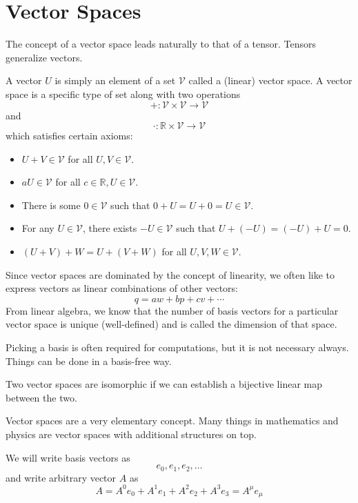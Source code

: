 


\tableofcontents



\chapter{Vector Spaces}
The concept of a vector space leads naturally to that of a tensor. Tensors generalize vectors.

A vector $U$ is simply an element of a set $\mathcal{V}$ called a (linear) vector space. A vector space is a specific type of set along with two operations \[ +: \mathcal{V}\times \mathcal{V} \rightarrow \mathcal{V} \] and \[ \cdot : \mathbb{R} \times \mathcal{V} \rightarrow \mathcal{V} \] which satisfies certain axioms:
\begin{itemize}
	\setlength\itemsep{0em}
	\item $U+V \in \mathcal{V}$ for all $U,V \in \mathcal{V}$.
	\item $aU \in \mathcal{V}$ for all $c\in \mathbb{R}, U \in \mathcal{V}$.
	\item There is some $0 \in \mathcal{V}$ such that $0+U=U+0=U \in \mathcal{V}$.
	\item For any $U \in \mathcal{V}$, there exists $-U \in \mathcal{V}$ such that $U+(-U) = (-U)+U = 0$.
	\item $\left(U+V\right)+W = U + \left(V+W\right)$ for all $U,V,W \in \mathcal{V}$.
\end{itemize}

Since vector spaces are dominated by the concept of linearity, we often like to express vectors as linear combinations of other vectors: \[ q = aw + bp + cv + \cdots \] From linear algebra, we know that the number of basis vectors for a particular vector space is unique (well-defined) and is called the dimension of that space.

Picking a basis is often required for computations, but it is not necessary always. Things can be done in a basis-free way.

Two vector spaces are isomorphic if we can establish a bijective linear map between the two.

Vector spaces are a very elementary concept. Many things in mathematics and physics are vector spaces with additional structures on top.

We will write basis vectors as \[ e_0, e_1, e_2 , \ldots \] and write arbitrary vector $A$ as \[ A = A^0e_0 + A^1e_1 + A^2e_2 + A^3e_3 = A^{\mu}  e_{\mu} \]


